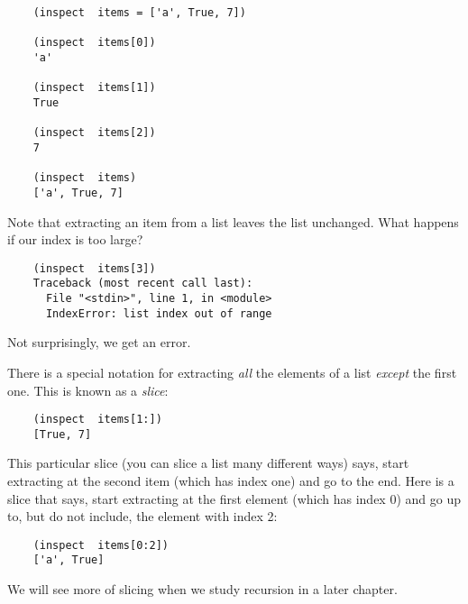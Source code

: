 \begin{verbatim}
    (inspect  items = ['a', True, 7])

    (inspect  items[0])
    'a'

    (inspect  items[1])
    True

    (inspect  items[2])
    7

    (inspect  items)
    ['a', True, 7]
\end{verbatim}

Note that extracting an item from a list leaves the list unchanged.
What happens if our index is too large?

\begin{verbatim}
    (inspect  items[3])
    Traceback (most recent call last):
      File "<stdin>", line 1, in <module>
      IndexError: list index out of range
\end{verbatim}

Not surprisingly, we get an error.

There is a special notation for extracting {\it all} the elements
of a list {\it except} the first one. This is known as a {\it slice}:

\begin{verbatim}
    (inspect  items[1:])
    [True, 7]
\end{verbatim}

This particular slice (you can slice a list many different ways) says,
start extracting at the second item (which has index one) and go
to the end. Here is a slice that says, start extracting at the first
element (which has index 0) and go up to, but do not include, the
element with index 2:

\begin{verbatim}
    (inspect  items[0:2])
    ['a', True]
\end{verbatim}

We will see more of slicing when we study recursion in a later chapter.
